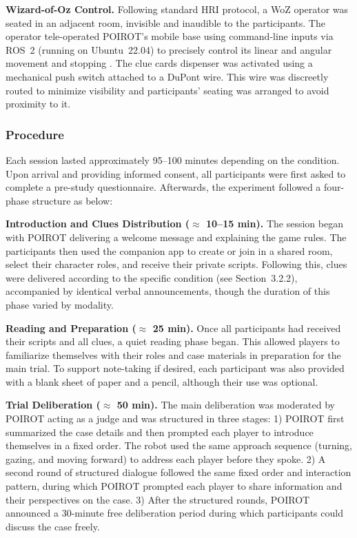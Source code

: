 \documentclass[sigconf,screen]{acmart-tagged}
\newcommand{\rev}[1]{#1}
\begin{document}
\noindent \textbf{Wizard-of-Oz Control.} 
Following standard HRI protocol, a WoZ operator was seated in an adjacent room, invisible and inaudible to the participants. The operator tele-operated POIROT's mobile base using command-line inputs via ROS~2 (running on Ubuntu~22.04) to precisely control its linear and angular movement and stopping \cite{macenski2022robot}. The clue cards dispenser was activated using a mechanical push switch attached to a DuPont wire. This wire was discreetly routed to minimize visibility and participants' seating was arranged to avoid proximity to it.

\vspace{-5pt}
\subsubsection{Procedure}
Each session lasted approximately 95--100 minutes depending on the condition. Upon arrival and providing informed consent, all participants were first asked to complete a pre-study questionnaire. Afterwards, the experiment followed a four-phase structure as below:

\noindent \textbf{Introduction and Clues Distribution ($\approx$ 10--15 min).} The session began with POIROT delivering a welcome message and explaining the game rules. The participants then used the companion app to create or join in a shared room, select their character roles, and receive their private scripts. \rev{Following this, clues were delivered according to the specific condition (see Section~3.2.2), accompanied by identical verbal announcements, though the duration of this phase varied by modality.}

\noindent \textbf{Reading and Preparation ($\approx$ 25 min).} Once all participants had received their scripts and all clues, a quiet reading phase began. This allowed players to familiarize themselves with their roles and case materials in preparation for the main trial. To support note-taking if desired, each participant was also provided with a blank sheet of paper and a pencil, although their use was optional.

\noindent \textbf{Trial Deliberation ($\approx$ 50 min).} The main deliberation was moderated by POIROT acting as a judge and was structured in three stages: \rev{1) POIROT first summarized the case details and then prompted each player to introduce themselves in a fixed order. The robot used the same approach sequence (turning, gazing, and moving forward) to address each player before they spoke. 2) A second round of structured dialogue followed the same fixed order and interaction pattern, during which POIROT prompted each player to share information and their perspectives on the case. 3) After the structured rounds, POIROT announced a 30-minute free deliberation period during which participants could discuss the case freely.}
\end{document}

